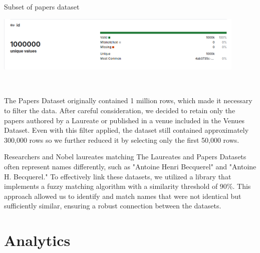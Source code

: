 \documentclass[aspectratio=169,xcolor=dvipsnames]{beamer}
\begin{document}
\begin{frame}{Subset of papers dataset}
    \centering
    \begin{minipage}{0.8\textwidth}
        \centering
        \includegraphics[width=0.9\textwidth]{huge_dataset.png}
    \end{minipage} \\
    \vspace{1em}
    \begin{minipage}{0.8\textwidth}
        The Papers Dataset originally contained 1 million rows, which made it necessary to filter the data.
		After careful consideration, we decided to retain only the papers authored by a Laureate or published
		in a venue included in the Venues Dataset.
        Even with this filter applied, the dataset still contained approximately 300,000 rows so we further
		reduced it by selecting only the first 50,000 rows.
    \end{minipage}
\end{frame}

\begin{frame}{Researchers and Nobel laureates matching}
        The Laureates and Papers Datasets often represent names differently, such as "Antoine Henri Becquerel"
		and "Antoine H. Becquerel." To effectively link these datasets, we utilized a library that implements a
		fuzzy matching algorithm with a similarity threshold of 90\%. This approach allowed us to identify and
		match names that were not identical but sufficiently similar, ensuring a robust connection between the
		datasets.
\end{frame}

\section{Analytics}
\end{document}
